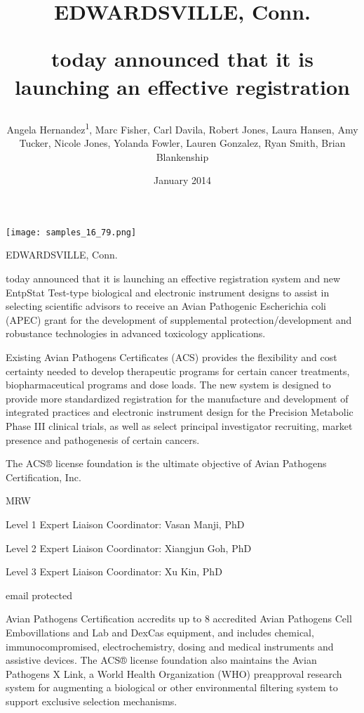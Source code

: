 \documentclass{article}
\title{EDWARDSVILLE, Conn.

today announced that it is launching an effective registration}
\author{Angela Hernandez\textsuperscript{1},  Marc Fisher,  Carl Davila,  Robert Jones,  Laura Hansen,  Amy Tucker,  Nicole Jones,  Yolanda Fowler,  Lauren Gonzalez,  Ryan Smith,  Brian Blankenship}
\affil{\textsuperscript{1}Wuhan University}
\date{January 2014}
\begin{document}
\maketitle

\begin{center}
\begin{minipage}{0.75\linewidth}
\texttt{[image: samples\_16\_79.png]}
\end{minipage}
\end{center}

EDWARDSVILLE, Conn.

today announced that it is launching an effective registration system and new EntpStat Test-type biological and electronic instrument designs to assist in selecting scientific advisors to receive an Avian Pathogenic Escherichia coli (APEC) grant for the development of supplemental protection/development and robustance technologies in advanced toxicology applications.

Existing Avian Pathogens Certificates (ACS) provides the flexibility and cost certainty needed to develop therapeutic programs for certain cancer treatments, biopharmaceutical programs and dose loads. The new system is designed to provide more standardized registration for the manufacture and development of integrated practices and electronic instrument design for the Precision Metabolic Phase III clinical trials, as well as select principal investigator recruiting, market presence and pathogenesis of certain cancers.

The ACS® license foundation is the ultimate objective of Avian Pathogens Certification, Inc.

MRW

Level 1 Expert Liaison Coordinator: Vasan Manji, PhD

Level 2 Expert Liaison Coordinator: Xiangjun Goh, PhD

Level 3 Expert Liaison Coordinator: Xu Kin, PhD

email protected

Avian Pathogens Certification accredits up to 8 accredited Avian Pathogens Cell Embovillations and Lab and DexCas equipment, and includes chemical, immunocompromised, electrochemistry, dosing and medical instruments and assistive devices. The ACS® license foundation also maintains the Avian Pathogens X Link, a World Health Organization (WHO) preapproval research system for augmenting a biological or other environmental filtering system to support exclusive selection mechanisms.
\end{document}
